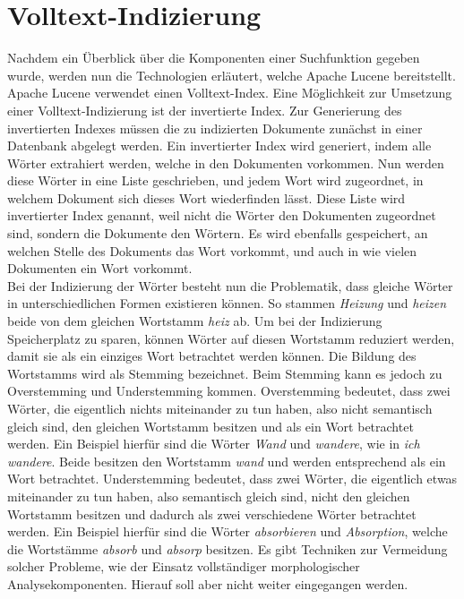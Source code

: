 

\section{Volltext-Indizierung}
\label{chap:volltext-indizierung}
Nachdem ein Überblick über die Komponenten einer Suchfunktion gegeben wurde, werden nun die Technologien erläutert, welche Apache Lucene bereitstellt.
Apache Lucene verwendet einen Volltext-Index.
Eine Möglichkeit zur Umsetzung einer Volltext-Indizierung ist der invertierte Index.
Zur Generierung des invertierten Indexes müssen die zu indizierten Dokumente zunächst in einer Datenbank abgelegt werden.
Ein invertierter Index wird generiert, indem alle Wörter extrahiert werden, welche in den Dokumenten vorkommen.
Nun werden diese Wörter in eine Liste geschrieben, und jedem Wort wird zugeordnet, in welchem Dokument sich dieses Wort wiederfinden lässt.
Diese Liste wird invertierter Index genannt, weil nicht die Wörter den Dokumenten zugeordnet sind, sondern die Dokumente den Wörtern.
Es wird ebenfalls gespeichert, an welchen Stelle des Dokuments das Wort vorkommt, und auch in wie vielen Dokumenten ein Wort vorkommt.\\

Bei der Indizierung der Wörter besteht nun die Problematik, dass gleiche Wörter in unterschiedlichen Formen existieren können.
So stammen \textit{Heizung} und \textit{heizen} beide von dem gleichen Wortstamm \textit{heiz} ab.
Um bei der Indizierung Speicherplatz zu sparen, können Wörter auf diesen Wortstamm reduziert werden, damit sie als ein einziges Wort betrachtet werden können.
Die Bildung des Wortstamms wird als Stemming bezeichnet.
Beim Stemming kann es jedoch zu Overstemming und Understemming kommen.
Overstemming bedeutet, dass zwei Wörter, die eigentlich nichts miteinander zu tun haben, also nicht semantisch gleich sind, den gleichen Wortstamm besitzen und als ein Wort betrachtet werden.
Ein Beispiel hierfür sind die Wörter \textit{Wand} und \textit{wandere}, wie in \textit{ich wandere}.
Beide besitzen den Wortstamm \textit{wand} und werden entsprechend als ein Wort betrachtet.
Understemming bedeutet, dass zwei Wörter, die eigentlich etwas miteinander zu tun haben, also semantisch gleich sind, nicht den gleichen Wortstamm besitzen und dadurch als zwei verschiedene Wörter betrachtet werden.
Ein Beispiel hierfür sind die Wörter \textit{absorbieren} und \textit{Absorption}, welche die Wortstämme \textit{absorb} und \textit{absorp} besitzen.
Es gibt Techniken zur Vermeidung solcher Probleme, wie der Einsatz vollständiger morphologischer Analysekomponenten.
Hierauf soll aber nicht weiter eingegangen werden.\\

